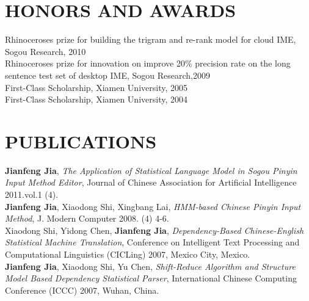 \documentclass{res}
\begin{document}
\begin{resume}
\section{HONORS AND AWARDS}             
     Rhinoceroses prize for building the trigram and re-rank model for cloud IME, Sogou Research, 2010 \\
     Rhinoceroses prize for innovation on improve 20\% precision rate on the long sentence test set of desktop IME, Sogou Research,2009 \\
     First-Class Scholarship, Xiamen University, 2005 \\
     First-Class Scholarship, Xiamen University, 2004 

\section{PUBLICATIONS}
     \textbf{Jianfeng Jia}, \emph{The Application of Statistical Language Model in Sogou Pinyin Input Method Editor}, Journal of Chinese Association for Artificial Intelligence 2011.vol.1 (4).\\
     \textbf{Jianfeng Jia}, Xiaodong Shi, Xingbang Lai, \emph{HMM-based Chinese Pinyin Input Method}, J. Modern Computer 2008. (4) 4-6.\\
     Xiaodong Shi, Yidong Chen, \textbf{Jianfeng Jia}, \emph{Dependency-Based Chinese-English Statistical Machine Translation}, Conference on Intelligent Text Processing and Computational Linguistics (CICLing) 2007, Mexico City, Mexico.\\
     \textbf{Jianfeng Jia}, Xiaodong Shi, Yu Chen, \emph{Shift-Reduce Algorithm and Structure Model Based Dependency Statistical Parser}, International Chinese Computing Conference (ICCC) 2007, Wuhan, China.

\end{resume}
\end{document}

